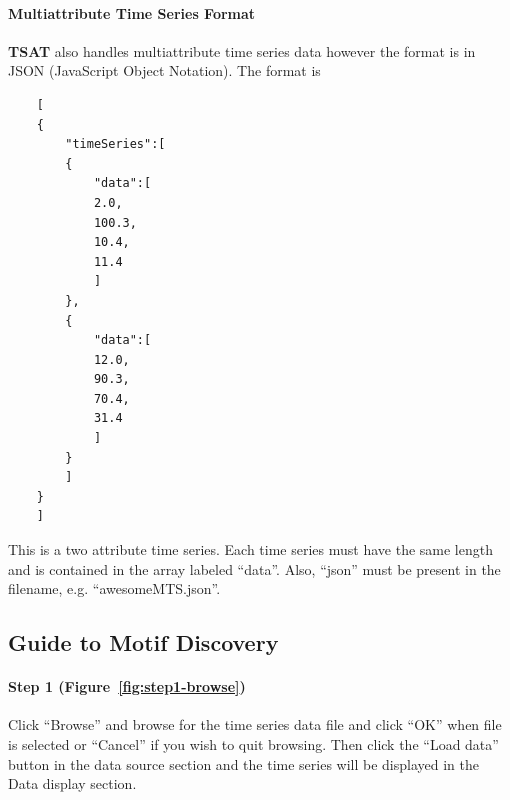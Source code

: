 \documentclass[titlepage, letterpaper, 12pt]{article}
\newcommand\TSAT{\textbf{TSAT}}
\begin{document}
\paragraph{Multiattribute Time Series Format}

{\TSAT} also handles multiattribute time series data however the format is in JSON (JavaScript Object Notation).  The format is

\begin{verbatim}
	[
	{
		"timeSeries":[
		{
			"data":[
			2.0,
			100.3,
			10.4,
			11.4
			]
		},
		{
			"data":[
			12.0,
			90.3,
			70.4,
			31.4
			]
		}
		]
	}
	]
\end{verbatim}

This is a two attribute time series.  Each time series must have the same length and is contained in the array labeled ``data''.  Also, ``json'' must be present in the filename, e.g. ``awesomeMTS.json''.

\subsection{Guide to Motif Discovery}



\paragraph{Step 1 (Figure~\ref{fig:step1-browse})} Click ``Browse'' and browse for the time series data file and click ``OK'' when file is selected or ``Cancel'' if you wish to quit browsing.  Then click the ``Load data'' button in the data source section and the time series will be displayed in the Data display section.
\end{document}
